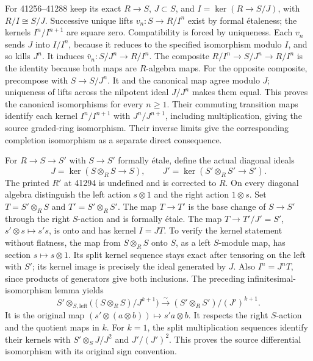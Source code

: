 For 41256--41288 keep its exact \(R\to S\), \(J\subset S\), and \(I=\ker(R\to S/J)\), with \(R/I\cong S/J\). Successive unique lifts \(v_n:S\to R/I^n\) exist by formal étaleness; the kernels \(I^n/I^{n+1}\) are square zero. Compatibility is forced by uniqueness. Each \(v_n\) sends \(J\) into \(I/I^n\), because it reduces to the specified isomorphism modulo \(I\), and so kills \(J^n\). It induces \(\bar v_n:S/J^n\to R/I^n\). The composite \(R/I^n\to S/J^n\to R/I^n\) is the identity because both maps are \(R\)-algebra maps. For the opposite composite, precompose with \(S\to S/J^n\). It and the canonical map agree modulo \(J\); uniqueness of lifts across the nilpotent ideal \(J/J^n\) makes them equal. This proves the canonical isomorphisms for every \(n\geq1\). Their commuting transition maps identify each kernel \(I^n/I^{n+1}\) with \(J^n/J^{n+1}\), including multiplication, giving the source graded-ring isomorphism. Their inverse limits give the corresponding completion isomorphism as a separate direct consequence.

For \(R\to S\to S'\) with \(S\to S'\) formally étale, define the actual diagonal ideals \[
J=\ker(S\otimes_RS\to S),\qquad
J'=\ker(S'\otimes_RS'\to S').
\] The printed \(R'\) at 41294 is undefined and is corrected to \(R\). On every diagonal algebra distinguish the left action \(s\otimes1\) and the right action \(1\otimes s\). Set \(T=S'\otimes_RS\) and \(T'=S'\otimes_RS'\). The map \(T\to T'\) is the base change of \(S\to S'\) through the right \(S\)-action and is formally étale. The map \(T\to T'/J'=S'\), \(s'\otimes s\mapsto s's\), is onto and has kernel \(I=JT\). To verify the kernel statement without flatness, the map from \(S\otimes_RS\) onto \(S\), as a left \(S\)-module map, has section \(s\mapsto s\otimes1\). Its split kernel sequence stays exact after tensoring on the left with \(S'\); its kernel image is precisely the ideal generated by \(J\). Also \(I^n=J^nT\), since products of generators give both inclusions. The preceding infinitesimal-isomorphism lemma yields \[
S'\otimes_{S,\mathrm{left}}
\bigl((S\otimes_RS)/J^{k+1}\bigr)
\xrightarrow{\sim}(S'\otimes_RS')/(J')^{k+1}.
\tag{CT-8}
\] It is the original map \((s'\otimes(a\otimes b))\mapsto s'a\otimes b\). It respects the right \(S\)-action and the quotient maps in \(k\). For \(k=1\), the split multiplication sequences identify their kernels with \(S'\otimes_S J/J^2\) and \(J'/(J')^2\). This proves the source differential isomorphism with its original sign convention.

